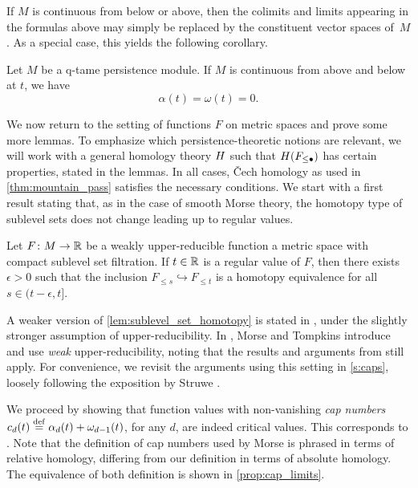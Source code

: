 If $M$ is continuous from below or above, then the colimits and limits appearing in the formulas above may simply be replaced by the constituent vector spaces of~$M$.
As a special case, this yields the following corollary.

\begin{cor}
\label{cor:regular_value_no_endpoint}
	Let $M$ be a q-tame persistence module.
	If $M$ is continuous from above and below at $t$, we have
	\[
		\alpha(t) = \omega(t) = 0.
	\]
\end{cor}

We now return to the setting of functions $F$ on metric spaces and prove some more lemmas.
To emphasize which persistence-theoretic notions are relevant, we will work with a general homology theory $H$ such that $H(F_{\leq \bullet})$ has certain properties, stated in the lemmas. 
In all cases, \v{C}ech homology as used in \cref{thm:mountain_pass} satisfies the necessary conditions.
We start with a first result stating that, as in the case of smooth Morse theory, the homotopy type of sublevel sets does not change leading up to regular values.

\begin{lem}\label{lem:sublevel_set_homotopy}
	Let $F \colon M \to \mathbb{R}$ be a weakly upper-reducible function a metric space with compact sublevel set filtration.
	If $t \in \mathbb{R}$ is a regular value of $F$, then there exists $\epsilon > 0$ such that the inclusion $F_{\leq s} \hookrightarrow F_{\leq t}$ is a homotopy equivalence for all $s \in (t - \epsilon, t]$.
\end{lem}

A weaker version of \cref{lem:sublevel_set_homotopy} is stated in \cite[Lemma 8.1]{Morse.1938}, under the slightly stronger assumption of upper-reducibility.
In \cite{Morse.1939}, Morse and Tompkins introduce and use \emph{weak} upper-reducibility, noting that the results and arguments from \cite[Sections 7 and 8]{Morse.1938} still apply.
For convenience, we revisit the arguments using this setting in \cref{s:caps}, loosely following the exposition by Struwe \cite[Remark II.6.3]{Struwe.1988}.

We proceed by showing that function values with non-vanishing \emph{cap numbers} $c_d(t) \stackrel{\mathrm{def}}{=} \alpha_d(t) + \omega_{d-1}(t)$, for any $d$, are indeed critical values.
This corresponds to \cite[Theorem 8.1]{Morse.1938}.
Note that the definition of cap numbers used by Morse is phrased in terms of relative homology, differing from our definition in terms of absolute homology. The equivalence of both definition is shown in \cref{prop:cap_limits}.

